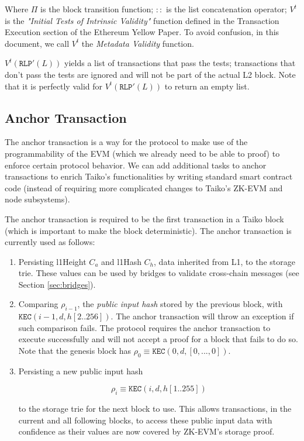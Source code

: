 \documentclass[9pt,oneside]{amsart}
\begin{document}
\begin{multicols}{2}
Where $\Pi$ is the block transition function; $::$ is the list concatenation operator; $V^t$ is the \emph{"Initial Tests of Intrinsic Validity"} function defined in the Transaction Execution section of the Ethereum Yellow Paper. To avoid confusion, in this document, we call $V^t$ the \emph{Metadata Validity} function.

$V^t(\texttt{RLP}'(L))$ yields a list of transactions that pass the tests; transactions that don't pass the tests are ignored and will not be part of the actual L2 block. Note that it is perfectly valid for $V^t(\texttt{RLP}'(L))$ to return an empty list.

\subsection{Anchor Transaction} \label{sec:anchoring}

The anchor transaction is a way for the protocol to make use of the programmability of the EVM (which we already need to be able to proof) to enforce certain protocol behavior. We can add additional tasks to anchor transactions to enrich Taiko's functionalities by writing standard smart contract code (instead of requiring more complicated changes to Taiko's ZK-EVM and node subsystems).

The anchor transaction is required to be the first transaction in a Taiko block (which is important to make the block deterministic). The anchor transaction is currently used as follows:

\begin{enumerate}
\item Persisting l1Height $C_a$ and l1Hash $C_h$, data inherited from L1, to the storage trie. These values can be used by bridges to validate cross-chain messages (see Section \ref{sec:bridges}).
\item Comparing $\rho_{i-1}$, the \textit{public input hash} stored by the previous block, with $\texttt{KEC}(i-1, d, h[2..256])$. The anchor transaction will throw an exception if such comparison fails. The protocol requires the anchor transaction to execute successfully and will not accept a proof for a block that fails to do so. Note that the genesis block has $\rho_0 \equiv \texttt{KEC}(0, d, [0,...,0])$.
\item Persisting a new public input hash

$$\rho_i \equiv \texttt{KEC}(i, d, h[1..255])$$ 

to the storage trie for the next block to use. This allows transactions, in the current and all following blocks, to access these public input data with confidence as their values are now covered by ZK-EVM's storage proof.
\end{enumerate}


\end{multicols}
\end{document}
